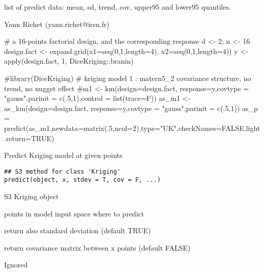 \documentclass[letterpaper]{book}
\begin{document}
%
\begin{Value}
list of predict data: mean, sd, trend, cov, upper95 and lower95 quantiles.
\end{Value}
%
\begin{Author}\relax
Yann Richet (yann.richet@irsn.fr)
\end{Author}
%
\begin{Examples}
\begin{ExampleCode}
# a 16-points factorial design, and the corresponding response
d <- 2; n <- 16
design.fact <- expand.grid(x1=seq(0,1,length=4), x2=seq(0,1,length=4))
y <- apply(design.fact, 1, DiceKriging::branin) 

#library(DiceKriging)
# kriging model 1 : matern5_2 covariance structure, no trend, no nugget effect
#m1 <-      km(design=design.fact, response=y,covtype = "gauss",parinit = c(.5,1),control = list(trace=F))
as_m1 <- as_km(design=design.fact, response=y,covtype = "gauss",parinit = c(.5,1))
as_p = predict(as_m1,newdata=matrix(.5,ncol=2),type="UK",checkNames=FALSE,light.return=TRUE)
\end{ExampleCode}
\end{Examples}
%
\begin{Description}\relax
Predict Kriging model at given points
\end{Description}
%
\begin{Usage}
\begin{verbatim}
## S3 method for class 'Kriging'
predict(object, x, stdev = T, cov = F, ...)
\end{verbatim}
\end{Usage}
%
\begin{Arguments}
\begin{ldescription}
\item[\code{object}] S3 Kriging object

\item[\code{x}] points in model input space where to predict

\item[\code{stdev}] return also standard deviation (default TRUE)

\item[\code{cov}] return covariance matrix between x points (default FALSE)

\item[\code{...}] Ignored
\end{ldescription}
\end{Arguments}
\end{document}
